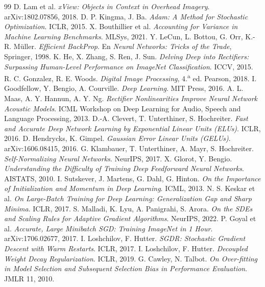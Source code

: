\newpage
\begin{thebibliography}{99}\small
{} D. Lam et al. \emph{xView: Objects in Context in Overhead Imagery}. arXiv:1802.07856, 2018.
 D. P. Kingma, J. Ba. \emph{Adam: A Method for Stochastic Optimization}. ICLR, 2015.
 X. Bouthillier et al. \emph{Accounting for Variance in Machine Learning Benchmarks}. MLSys, 2021.
 Y. LeCun, L. Bottou, G. Orr, K.-R. Müller. \emph{Efficient BackProp}. En \emph{Neural Networks: Tricks of the Trade}, Springer, 1998.
 K. He, X. Zhang, S. Ren, J. Sun. \emph{Delving Deep into Rectifiers: Surpassing Human-Level Performance on ImageNet Classification}. ICCV, 2015.
 R. C. Gonzalez, R. E. Woods. \emph{Digital Image Processing}, 4.\textsuperscript{a} ed. Pearson, 2018.
 I. Goodfellow, Y. Bengio, A. Courville. \emph{Deep Learning}. MIT Press, 2016.
 A. L. Maas, A. Y. Hannun, A. Y. Ng. \emph{Rectifier Nonlinearities Improve Neural Network Acoustic Models}. ICML Workshop on Deep Learning for Audio, Speech and Language Processing, 2013.
 D.-A. Clevert, T. Unterthiner, S. Hochreiter. \emph{Fast and Accurate Deep Network Learning by Exponential Linear Units (ELUs)}. ICLR, 2016.
 D. Hendrycks, K. Gimpel. \emph{Gaussian Error Linear Units (GELUs)}. arXiv:1606.08415, 2016.
 G. Klambauer, T. Unterthiner, A. Mayr, S. Hochreiter. \emph{Self-Normalizing Neural Networks}. NeurIPS, 2017.
 X. Glorot, Y. Bengio. \emph{Understanding the Difficulty of Training Deep Feedforward Neural Networks}. AISTATS, 2010.
 I. Sutskever, J. Martens, G. Dahl, G. Hinton. \emph{On the Importance of Initialization and Momentum in Deep Learning}. ICML, 2013.
 N. S. Keskar et al. \emph{On Large-Batch Training for Deep Learning: Generalization Gap and Sharp Minima}. ICLR, 2017.
 S. Malladi, K. Lyu, A. Panigrahi, S. Arora. \emph{On the SDEs and Scaling Rules for Adaptive Gradient Algorithms}. NeurIPS, 2022.
 P. Goyal et al. \emph{Accurate, Large Minibatch SGD: Training ImageNet in 1 Hour}. arXiv:1706.02677, 2017.
 I. Loshchilov, F. Hutter. \emph{SGDR: Stochastic Gradient Descent with Warm Restarts}. ICLR, 2017.
 I. Loshchilov, F. Hutter. \emph{Decoupled Weight Decay Regularization}. ICLR, 2019.
 G. Cawley, N. Talbot. \emph{On Over-fitting in Model Selection and Subsequent Selection Bias in Performance Evaluation}. JMLR 11, 2010.
\end{thebibliography}
